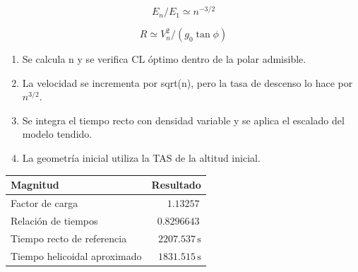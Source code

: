 \begin{equation}E_n/E_1\simeq n^{-3/2}\end{equation}

\begin{equation}R\simeq V_n^2/(g_0\tan\phi)\end{equation}


\begin{enumerate}

\item Se calcula n y se verifica CL óptimo dentro de la polar admisible.

\item La velocidad se incrementa por sqrt(n), pero la tasa de descenso lo hace por $n^{3/2}$.

\item Se integra el tiempo recto con densidad variable y se aplica el escalado del modelo tendido.

\item La geometría inicial utiliza la TAS de la altitud inicial.

\end{enumerate}





\begin{center}\begin{tabular}{lr}\toprule Magnitud&Resultado\\\midrule

Factor de carga & $1.13257\,$\\

Relación de tiempos & $0.8296643\,$\\

Tiempo recto de referencia & $2207.537\,\mathrm s$\\

Tiempo helicoidal aproximado & $1831.515\,\mathrm s$\\

\bottomrule\end{tabular}\end{center}

